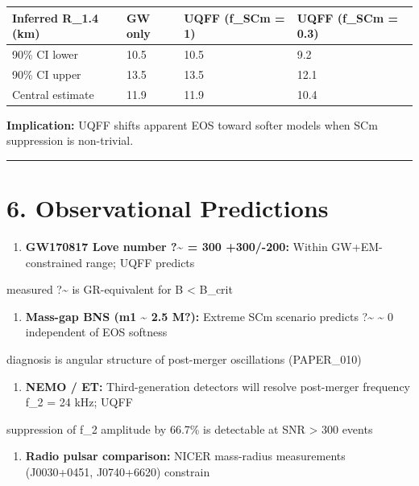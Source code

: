 \documentclass[11pt]{article}
\begin{document}
\begin{center}
\begin{longtable}{llll}
\toprule
Inferred R\_1.4 (km) & GW only & UQFF (f\_SCm = 1) & UQFF (f\_SCm = 0.3) \tabularnewline
\midrule
\endhead
90\% CI lower & 10.5 & 10.5 & 9.2 \tabularnewline
90\% CI upper & 13.5 & 13.5 & 12.1 \tabularnewline
Central estimate & 11.9 & 11.9 & 10.4 \tabularnewline
\bottomrule
\end{longtable}
\end{center}

\textbf{Implication:} UQFF shifts apparent EOS toward softer models when SCm suppression is non-trivial.

\noindent\rule{\textwidth}{0.4pt}

\section*{6. Observational Predictions}

\begin{enumerate}
  \item \textbf{GW170817 Love number ?\textasciitilde{} = 300 +300/-200:} Within GW+EM-constrained range; UQFF predicts
\end{enumerate}

measured ?\textasciitilde{} is GR-equivalent for B < B\_crit

\begin{enumerate}
  \item \textbf{Mass-gap BNS (m1 \textasciitilde{} 2.5 M?):} Extreme SCm scenario predicts ?\textasciitilde{} \textasciitilde{} 0 independent of EOS softness 
\end{enumerate}

diagnosis is angular structure of post-merger oscillations (PAPER\_010)

\begin{enumerate}
  \item \textbf{NEMO / ET:} Third-generation detectors will resolve post-merger frequency f\_2 = 24 kHz; UQFF
\end{enumerate}

suppression of f\_2 amplitude by 66.7\% is detectable at SNR > 300 events

\begin{enumerate}
  \item \textbf{Radio pulsar comparison:} NICER mass-radius measurements (J0030+0451, J0740+6620) constrain
\end{enumerate}
\end{document}
